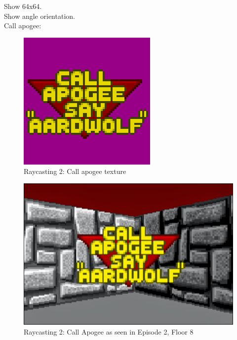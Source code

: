 Show 64x64.\\
Show angle orientation.\\

Call apogee:\\
\begin{figure}[H]
  \centering
 \includegraphics[scale=1.3]{imgs/call_apogee_texture.png}
 \caption{Raycasting 2: Call apogee texture} \label{fig:callapogeesprite}
\end{figure}

\begin{figure}[H]
  \centering
 \includegraphics[scale=0.6]{imgs/call_apogee.png}
 \caption{Raycasting 2: Call Apogee as seen in  Episode 2, Floor 8} \label{fig:callapogeeingame}
\end{figure}

